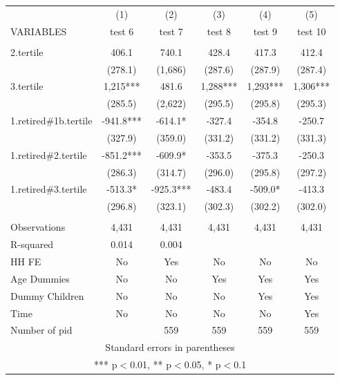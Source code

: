 \begin{tabular}{lccccc} \hline
 & (1) & (2) & (3) & (4) & (5) \\
VARIABLES & test 6 & test 7 & test 8 & test 9 & test 10 \\ \hline
 &  &  &  &  &  \\
2.tertile & 406.1 & 740.1 & 428.4 & 417.3 & 412.4 \\
 & (278.1) & (1,686) & (287.6) & (287.9) & (287.4) \\
3.tertile & 1,215*** & 481.6 & 1,288*** & 1,293*** & 1,306*** \\
 & (285.5) & (2,622) & (295.5) & (295.8) & (295.3) \\
1.retired\#1b.tertile & -941.8*** & -614.1* & -327.4 & -354.8 & -250.7 \\
 & (327.9) & (359.0) & (331.2) & (331.2) & (331.3) \\
1.retired\#2.tertile & -851.2*** & -609.9* & -353.5 & -375.3 & -250.3 \\
 & (286.3) & (314.7) & (296.0) & (295.8) & (297.2) \\
1.retired\#3.tertile & -513.3* & -925.3*** & -483.4 & -509.0* & -413.3 \\
 & (296.8) & (323.1) & (302.3) & (302.2) & (302.0) \\
 &  &  &  &  &  \\
Observations & 4,431 & 4,431 & 4,431 & 4,431 & 4,431 \\
R-squared & 0.014 & 0.004 &  &  &  \\
HH FE & No & Yes & No & No & No \\
Age Dummies & No & No & Yes & Yes & Yes \\
Dummy Children & No & No & No & Yes & Yes \\
Time & No & No & No & No & Yes \\
 Number of pid &  & 559 & 559 & 559 & 559 \\ \hline
\multicolumn{6}{c}{ Standard errors in parentheses} \\
\multicolumn{6}{c}{ *** p$<$0.01, ** p$<$0.05, * p$<$0.1} \\
\end{tabular}

